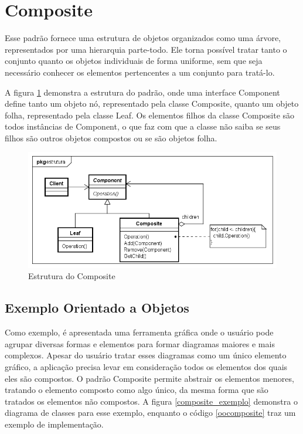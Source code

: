 \section{Composite}

Esse padrão fornece uma estrutura de objetos 
organizados como uma árvore, representados 
por uma hierarquia parte-todo. 
Ele torna possível tratar tanto o conjunto 
quanto os objetos individuais de forma 
uniforme, sem que seja necessário conhecer 
os elementos pertencentes a um conjunto para 
tratá-lo.

A figura \ref{composite_struct} demonstra a 
estrutura do padrão, onde uma interface Component 
define tanto um objeto nó, representado pela 
classe Composite, quanto um objeto folha, 
representado pela classe Leaf. Os elementos 
filhos da classe Composite são todos instâncias 
de Component, o que faz com que a classe não 
saiba se seus filhos são outros objetos compostos 
ou se são objetos folha.

\begin{figure}[htb]
	\caption{\label{composite_struct}Estrutura do Composite}
	\begin{center}
	    \includegraphics[scale=0.5]{5_padroes-contexto-funcional/5.2_estruturais/5.2.3_composite/composite_estrutura.png}
	\end{center}
\end{figure}

\subsection*{Exemplo Orientado a Objetos}

Como exemplo, é apresentada uma ferramenta gráfica 
onde o usuário pode agrupar diversas formas e 
elementos 
para formar diagramas maiores e mais complexos. 
Apesar do usuário tratar esses diagramas como um 
único elemento gráfico, a aplicação precisa levar 
em consideração todos os elementos dos quais eles 
são compostos. O padrão Composite permite 
abstrair os elementos menores, tratando o elemento 
composto como algo único, da mesma forma que 
são tratados os elementos não compostos. A figura 
\ref{composite_exemplo} demonstra o diagrama de 
classes para esse exemplo, enquanto o código 
\ref{oocomposite} traz um exemplo de implementação.

